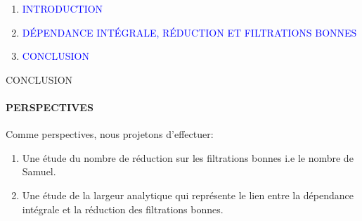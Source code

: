 \documentclass[11pt,a4paper]{beamer}
\begin{document}
\begin{frame}
	\begin{enumerate}
		\item<0> \textcolor{blue}{INTRODUCTION}\\
		\item<0> \textcolor{blue}{DÉPENDANCE INTÉGRALE, RÉDUCTION ET FILTRATIONS BONNES }\\
		\item<1> \textcolor{blue}{CONCLUSION}\\
	\end{enumerate}
\end{frame}

\begin{frame}{CONCLUSION}
	\framesubtitle{PERSPECTIVES}
	\begin{block}{}	
Comme perspectives, nous projetons d'effectuer:\\
		\begin{enumerate}
			\item Une étude du nombre de réduction sur les filtrations bonnes i.e le nombre de Samuel.
			\item Une étude de la largeur analytique qui représente le lien entre la dépendance intégrale et la réduction des filtrations bonnes.
		\end{enumerate}
	\end{block}
\end{frame}

\end{document}
